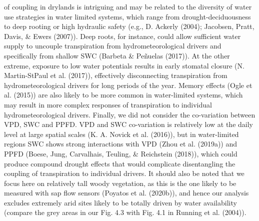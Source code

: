 \documentclass[11pt,twoside]{reedthesis}
\begin{document}
of coupling in drylands is intriguing and may be related to the
diversity of water use strategies in water limited systems, which range
from drought-deciduousness to deep rooting or high hydraulic safety
(e.g., D. Ackerly (2004); Jacobsen, Pratt, Davis, \& Ewers (2007)). Deep
roots, for instance, could allow sufficient water supply to uncouple
transpiration from hydrometeorological drivers and specifically from
shallow SWC (Barbeta \& Peñuelas (2017)). At the other extreme, exposure
to low water potentials results in early stomatal closure (N.
Martin-StPaul et al. (2017)), effectively disconnecting transpiration
from hydrometeorological drivers for long periods of the year. Memory
effects (Ogle et al. (2015)) are also likely to be more common in
water-limited systems, which may result in more complex responses of
transpiration to individual hydrometeorological drivers. Finally, we did
not consider the co-variation between VPD, SWC and PPFD. VPD and SWC
co-variation is relatively low at the daily level at large spatial
scales (K. A. Novick et al. (2016)), but in water-limited regions SWC
shows strong interactions with VPD (Zhou et al. (2019a)) and PPFD
(Boese, Jung, Carvalhais, Teuling, \& Reichstein (2018)), which could
produce compound drought effects that would complicate disentangling the
coupling of transpiration to individual drivers. It should also be noted
that we focus here on relatively tall woody vegetation, as this is the
one likely to be measured with sap flow sensors (Poyatos et al.
(2020b)), and hence our analysis excludes extremely arid sites likely to
be totally driven by water availability (compare the grey areas in our
Fig. 4.3 with Fig. 4.1 in Running et al. (2004)).\par
\end{document}
